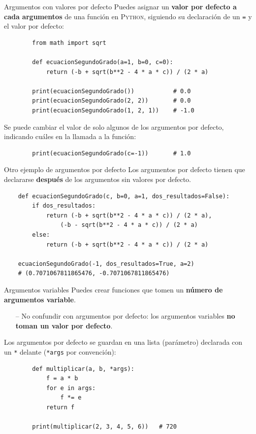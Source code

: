 \documentclass[10pt]{beamer} %
\newcommand{\py}{\textsc{Python}}
\begin{document}
\begin{frame}[fragile]{Argumentos con valores por defecto}
    Puedes asignar un \textbf{valor por defecto a cada argumentos} de una función en \py, siguiendo su declaración de un \texttt{=} y el valor por defecto:
    \begin{verbatim}
        from math import sqrt
    
        def ecuacionSegundoGrado(a=1, b=0, c=0):
            return (-b + sqrt(b**2 - 4 * a * c)) / (2 * a)
        
        print(ecuacionSegundoGrado())           # 0.0
        print(ecuacionSegundoGrado(2, 2))       # 0.0
        print(ecuacionSegundoGrado(1, 2, 1))    # -1.0
    \end{verbatim}
    Se puede cambiar el valor de solo algunos de los argumentos por defecto, indicando cuáles en la llamada a la función:
    \begin{verbatim}
        print(ecuacionSegundoGrado(c=-1))       # 1.0
    \end{verbatim}
\end{frame}

\begin{frame}[fragile]{Otro ejemplo de argumentos por defecto}
    Los argumentos por defecto tienen que declararse \textbf{después} de los argumentos sin valores por defecto.
    \begin{verbatim}
    def ecuacionSegundoGrado(c, b=0, a=1, dos_resultados=False):
        if dos_resultados:
            return (-b + sqrt(b**2 - 4 * a * c)) / (2 * a),
                (-b - sqrt(b**2 - 4 * a * c)) / (2 * a)
        else:
            return (-b + sqrt(b**2 - 4 * a * c)) / (2 * a)
            
    ecuacionSegundoGrado(-1, dos_resultados=True, a=2)
    # (0.7071067811865476, -0.7071067811865476)
    \end{verbatim}
\end{frame}

\begin{frame}[fragile]{Argumentos variables}
    Puedes crear funciones que tomen un \textbf{número de argumentos variable}.
    \begin{itemize}
        \item[--] No confundir con argumentos por defecto: los argumentos variables \textbf{no toman un valor por defecto}.
    \end{itemize}
    Los argumentos por defecto se guardan en una lista (parámetro) declarada con un \texttt{*} delante (\texttt{*args} por convención):
    \begin{verbatim}
        def multiplicar(a, b, *args):
            f = a * b
            for e in args:
                f *= e
            return f

        print(multiplicar(2, 3, 4, 5, 6))   # 720
    \end{verbatim}
\end{frame}
\end{document}

